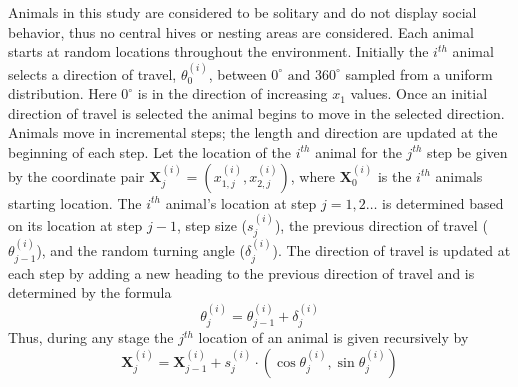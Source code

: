 \documentclass[preprint,12pt]{elsarticle}
\numberwithin{equation}{subsection}
\begin{document}
Animals in this study are considered to be solitary and do not display social
behavior, thus no central hives or nesting areas are considered. Each animal
starts at random locations throughout the environment. Initially the $i^{th}$
animal selects a direction of travel, $\theta^{\left(i\right)}_0$, between
$0^{\circ} \mbox{ and } 360^{\circ}$ sampled from a uniform distribution. Here
$0^\circ$ is in the direction of increasing $x_1$ values. Once an initial
direction of travel is selected the animal begins to move in the selected
direction. Animals move in incremental steps; the length and direction are
updated at the beginning of each step. Let the location of the $i^{th}$ animal
for the $j^{th}$ step be given by the coordinate pair
$\mathbf{X}^{\left(i\right)}_j=\left(x^{\left(i\right)}_{1,j},
x^{\left(i\right)}_{2,j}\right)$, where $\mathbf{X}^{\left(i\right)}_0$ is the
$i^{th}$ animals starting location. The $i^{th}$ animal's location at step
$j=1,2\dots$ is determined based on its location at step $j-1$, step size
($s^{\left(i\right)}_j$), the previous direction of travel
($\theta^{\left(i\right)}_{j - 1}$), and the random turning angle
($\delta^{\left(i\right)}_j$). The direction of travel is updated at each step
by adding a new heading to the previous direction of travel and is determined by
the formula
\[
	\theta^{\left(i\right)}_j = \theta^{\left(i\right)}_{j-1} +
\delta^{\left(i\right)}_j
\]
Thus, during any stage the $j^{th}$ location of an animal is given recursively
by
\[
	\mathbf{X}^{\left(i\right)}_j = \mathbf{X}^{\left(i\right)}_{j-1} +
s^{\left(i\right)}_j \cdot
		\left(\cos \theta^{\left(i\right)}_j, \sin
\theta^{\left(i\right)}_j \right)
\]
\end{document}
